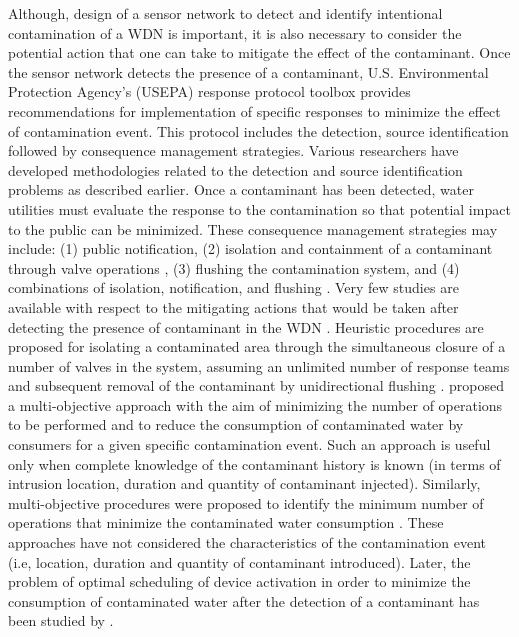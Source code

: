 \documentclass[authoryear,preprint,review,12pt]{elsarticle}
\begin{document}

Although, design of a sensor network to detect and identify intentional contamination of a WDN is important, it is also necessary to consider the potential action that one can take to mitigate
the effect of the contaminant. Once the sensor network detects the presence of  a contaminant, U.S. Environmental Protection Agency's (USEPA) response protocol toolbox \citep{USEPA2004a} provides recommendations for implementation of specific responses to minimize the effect of contamination event. This protocol includes the detection, source identification followed by consequence management strategies. Various researchers have developed  methodologies related to the detection and source
 identification problems as described earlier. Once a contaminant has been detected, water utilities must evaluate the response to the contamination so that potential impact to the public can be minimized.  These consequence management strategies may include: (1) public notification, (2) isolation and containment of a contaminant through valve operations \citep{USEPA2004a}, (3) flushing the contamination system, and (4) combinations of isolation, notification, and flushing \citep{USEPA2004b}.
 Very few studies are available  with respect to the  mitigating actions that would be taken after detecting the presence of contaminant in the WDN \citep{Poulin2008-heuristic, Poulin-2010, Preis2008-Multiobjective,  Guidorzi2009-Amultiobjective, Alfonso2010-MultiobjectiveOptimization} . Heuristic  procedures are proposed   for isolating a contaminated area through the simultaneous closure of a number of valves in the system, assuming an unlimited number of response teams and subsequent
 removal of the contaminant by unidirectional
flushing \cite{Poulin2008-heuristic, Poulin-2010} . \cite{Preis2008-Multiobjective} proposed a multi-objective approach with the aim of minimizing the number of operations to be performed and
to reduce the consumption of contaminated water by consumers for a given  specific contamination event. Such an approach is  useful only when complete knowledge of the contaminant history is known (in terms of intrusion location,  duration and quantity of contaminant injected). Similarly,   multi-objective procedures were proposed  to identify the minimum number of operations that minimize the contaminated water consumption \citep{Guidorzi2009-Amultiobjective, Alfonso2010-MultiobjectiveOptimization}.  These approaches \citep{Guidorzi2009-Amultiobjective, Alfonso2010-MultiobjectiveOptimization}  have not considered the characteristics of the contamination event (i.e, location, duration and quantity of contaminant introduced). Later,  the problem of optimal scheduling of device activation in order to minimize the consumption of contaminated water after the detection of a contaminant has been studied by \cite{Alvisi345-Nearoptimal}.
\end{document}
